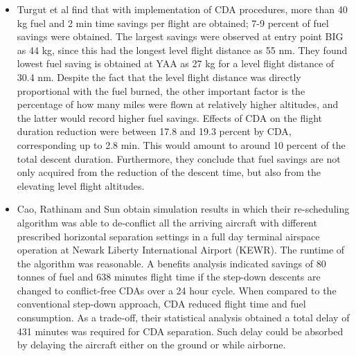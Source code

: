 \documentclass{aer1315-pretty}
\begin{document}
\begin{itemize}
\item Turgut et al \cite{Enis:2010}find that with implementation of CDA procedures, more than 40 kg fuel and 2 min time savings per flight are obtained;  7-9 percent of fuel savings were obtained. The largest savings were observed at entry point BIG as 44 kg, since this had the longest level flight distance as 55 nm. They found lowest fuel saving is obtained at YAA as 27 kg for a level flight distance of 30.4 nm. Despite the fact that the level flight distance was directly proportional with the fuel burned, the other important factor is the percentage of how many miles were flown at relatively higher altitudes, and the latter would record higher fuel savings.  Effects of CDA on the flight duration reduction were between 17.8 and 19.3 percent by CDA, corresponding up to 2.8 min. This would amount to around 10 percent of the total descent duration.  Furthermore, they conclude that fuel savings are not only acquired from the reduction of the descent time, but also from the elevating level flight altitudes.


\item Cao, Rathinam and Sun \cite{Cao:2011} 
obtain simulation results in which their re-scheduling algorithm was able to de-conflict all the arriving aircraft with different prescribed horizontal separation settings in a full day terminal airspace operation at Newark Liberty International Airport (KEWR). The runtime of the algorithm was reasonable. A benefits analysis indicated savings of 80 tonnes of fuel and 638 minutes flight time if the step-down descents are changed to conflict-free CDAs over a 24 hour cycle. When compared to the conventional step-down approach, CDA reduced flight time and fuel consumption. As a trade-off, their statistical analysis obtained a total delay of 431 minutes was required for CDA separation. Such delay could be absorbed by delaying the aircraft either on the ground or while airborne. 



\end{itemize}
\end{document}
